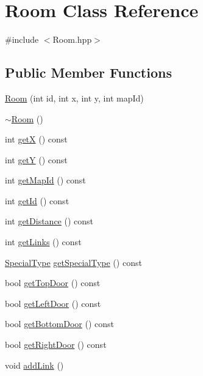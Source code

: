 \hypertarget{class_room}{\section{Room Class Reference}
\label{class_room}
}


{\ttfamily \#include $<$Room.\-hpp$>$}

\subsection*{Public Member Functions}
\begin{DoxyCompactItemize}
\item 
\hyperlink{class_room_aaef0b08fe3796290d4609470ddd9a0c4}{Room} (int id, int x, int y, int map\-Id)
\item 
\hyperlink{class_room_a67d5da09983cc53097807fd43ba5481a}{$\sim$\-Room} ()
\item 
int \hyperlink{class_room_a067f0dbf1e1981f3f53692c454032bad}{get\-X} () const 
\item 
int \hyperlink{class_room_a36707f281040aa8d27f13070b1a35b20}{get\-Y} () const 
\item 
int \hyperlink{class_room_ad36e96122696a31eec31a52ac99c4a4b}{get\-Map\-Id} () const 
\item 
int \hyperlink{class_room_a6f71af918166e1835662982219559d29}{get\-Id} () const 
\item 
int \hyperlink{class_room_a977bd80b8c374edb31eb467d191b7233}{get\-Distance} () const 
\item 
int \hyperlink{class_room_a63e8fe415cd7f3e7f327bf7603388638}{get\-Links} () const 
\item 
\hyperlink{_room_8hpp_a3879bd0aba9f20985139f480b9f73323}{Special\-Type} \hyperlink{class_room_a97488664cbabc4cef3a63d18526b5fc0}{get\-Special\-Type} () const 
\item 
bool \hyperlink{class_room_ad490b94e5406c002c875b4a507674008}{get\-Top\-Door} () const 
\item 
bool \hyperlink{class_room_a3b86ce135752e252c7f2900f29abbb6f}{get\-Left\-Door} () const 
\item 
bool \hyperlink{class_room_acb8b99c54a262c532a2b4f388fafc36a}{get\-Bottom\-Door} () const 
\item 
bool \hyperlink{class_room_a257c82e3ac31634b8612c33900fc28bc}{get\-Right\-Door} () const 
\item 
void \hyperlink{class_room_ab9ce2180afaa86a1881a245d1b539e03}{add\-Link} ()
\item 

\end{DoxyCompactItemize}
